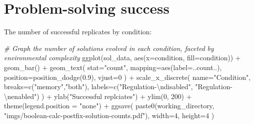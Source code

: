 \documentclass[
]{book}
\newenvironment{Shaded}{\begin{snugshade}}{\end{snugshade}}
\newcommand{\AttributeTok}[1]{\textcolor[rgb]{0.77,0.63,0.00}{#1}}
\newcommand{\CommentTok}[1]{\textcolor[rgb]{0.56,0.35,0.01}{\textit{#1}}}
\newcommand{\DecValTok}[1]{\textcolor[rgb]{0.00,0.00,0.81}{#1}}
\newcommand{\DocumentationTok}[1]{\textcolor[rgb]{0.56,0.35,0.01}{\textbf{\textit{#1}}}}
\newcommand{\FloatTok}[1]{\textcolor[rgb]{0.00,0.00,0.81}{#1}}
\newcommand{\FunctionTok}[1]{\textcolor[rgb]{0.00,0.00,0.00}{#1}}
\newcommand{\NormalTok}[1]{#1}
\newcommand{\OtherTok}[1]{\textcolor[rgb]{0.56,0.35,0.01}{#1}}
\newcommand{\SpecialCharTok}[1]{\textcolor[rgb]{0.00,0.00,0.00}{#1}}
\newcommand{\StringTok}[1]{\textcolor[rgb]{0.31,0.60,0.02}{#1}}
\begin{document}
\begin{Shaded}
\end{Shaded}

\hypertarget{problem-solving-success-3}{%
\section{Problem-solving success}\label{problem-solving-success-3}}

The number of successful replicates by condition:

\begin{Shaded}
\begin{Highlighting}[]
\CommentTok{\# Graph the number of solutions evolved in each condition, faceted by environmental complexity}
\FunctionTok{ggplot}\NormalTok{(sol\_data, }\FunctionTok{aes}\NormalTok{(}\AttributeTok{x=}\NormalTok{condition, }\AttributeTok{fill=}\NormalTok{condition)) }\SpecialCharTok{+}
  \FunctionTok{geom\_bar}\NormalTok{() }\SpecialCharTok{+}
  \FunctionTok{geom\_text}\NormalTok{(}
    \AttributeTok{stat=}\StringTok{"count"}\NormalTok{,}
    \AttributeTok{mapping=}\FunctionTok{aes}\NormalTok{(}\AttributeTok{label=}\NormalTok{..count..),}
    \AttributeTok{position=}\FunctionTok{position\_dodge}\NormalTok{(}\FloatTok{0.9}\NormalTok{),}
    \AttributeTok{vjust=}\DecValTok{0}
\NormalTok{  ) }\SpecialCharTok{+}
  \FunctionTok{scale\_x\_discrete}\NormalTok{(}
    \AttributeTok{name=}\StringTok{"Condition"}\NormalTok{,}
    \AttributeTok{breaks=}\FunctionTok{c}\NormalTok{(}\StringTok{"memory"}\NormalTok{,}\StringTok{"both"}\NormalTok{),}
    \AttributeTok{labels=}\FunctionTok{c}\NormalTok{(}\StringTok{"Regulation{-}}\SpecialCharTok{\textbackslash{}n}\StringTok{disabled"}\NormalTok{, }\StringTok{"Regulation{-}}\SpecialCharTok{\textbackslash{}n}\StringTok{enabled"}\NormalTok{)}
\NormalTok{  ) }\SpecialCharTok{+}
  \FunctionTok{ylab}\NormalTok{(}\StringTok{"Successful replciates"}\NormalTok{) }\SpecialCharTok{+}
  \FunctionTok{ylim}\NormalTok{(}\DecValTok{0}\NormalTok{, }\DecValTok{200}\NormalTok{) }\SpecialCharTok{+}
  \FunctionTok{theme}\NormalTok{(}\AttributeTok{legend.position =} \StringTok{"none"}\NormalTok{) }\SpecialCharTok{+}
  \FunctionTok{ggsave}\NormalTok{(}
    \FunctionTok{paste0}\NormalTok{(working\_directory, }\StringTok{"imgs/boolean{-}calc{-}postfix{-}solution{-}counts.pdf"}\NormalTok{),}
    \AttributeTok{width=}\DecValTok{4}\NormalTok{,}
    \AttributeTok{height=}\DecValTok{4}
\NormalTok{  )}
\end{Highlighting}
\end{Shaded}
\end{document}
